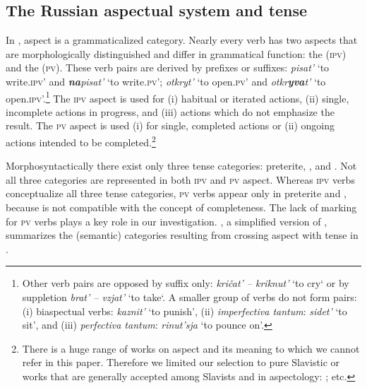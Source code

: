 \documentclass[output=paper,colorlinks,citecolor=brown,newtxmath,hidelinks]{langscibook}
\begin{document}
\subsection{The Russian aspectual system and tense} \label{sub:eins:2}

In , aspect is a grammaticalized category. Nearly every  verb has two aspects that are morphologically distinguished and differ in grammatical function: the  (\textsc{ipv}) and the  (\textsc{pv}). These verb pairs are derived by prefixes or suffixes: \textit{pisat'} ‘to write\textsc{.ipv}’ and \textit{\textbf{na}pisat'} ‘to write\textsc{.pv}’; \textit{otkryt'} ‘to open\textsc{.pv}’ and \textit{otkr\textbf{yva}t'} ‘to open\textsc{.ipv}’.\footnote{Other verb pairs are opposed by suffix only: \textit{kričat' -- kriknut'} ‘to cry‘ or by suppletion \textit{brat' -- vzjat'} ‘to take‘. A smaller group of verbs do not form pairs: (i) biaspectual verbs: \textit{kaznit'} ‘to punish’, (ii) \textit{imperfectiva tantum}: \textit{sidet'} ‘to sit’, and (iii) \textit{perfectiva tantum}: \textit{rinut'sja} ‘to pounce on’.} The \textsc{ipv} aspect is used for (i) habitual or iterated actions, (ii) single, incomplete actions in progress, and (iii) actions which do not emphasize the result. The \textsc{pv} aspect is used (i) for  single, completed actions or (ii) ongoing actions intended to be completed.\footnote{There is a huge range of works on  aspect and its meaning to which we cannot refer in this paper. Therefore we limited our selection to pure Slavistic or  works that are generally accepted among Slavists and in  aspectology: \citet{Anstatt2003,Avilova1976,Bondarko1971,Breu1980,Breu2000ProblemederInteraktion,Comrie1976,Dickey2000,Galton1976,Klein1995,Lehmann1999,Maslov1984,Mehlig1980,Paduceva1996,Petruchina2000,Rassudova1968,Zaliznjak2000}; etc.}

Morphosyntactically there exist only  three tense categories: preterite, , and . Not all three categories are represented in both \textsc{ipv} and \textsc{pv} aspect. Whereas \textsc{ipv} verbs conceptualize all three tense categories, \textsc{pv} verbs appear only in preterite and , because  is not compatible with the concept of completeness. The lack of  marking for \textsc{pv} verbs plays a key role in our investigation. , a simplified version of \citet{Swan1978}, summarizes the (semantic) categories resulting from crossing aspect with tense in .
\end{document}
